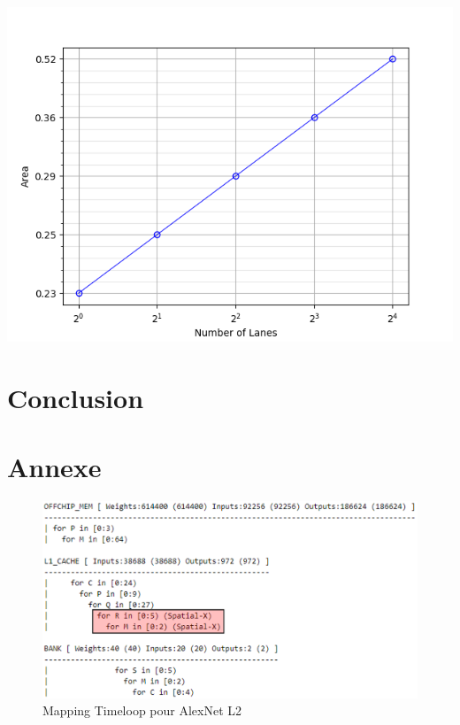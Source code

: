 \documentclass[10pt,letterpaper]{article}
\begin{document}
\begin{multicols}{2}
    {\centering
    \includegraphics[width=\linewidth]{area.png}
    \captionsetup{hypcap=false}
    \label{fig:area}}
    \bigskip

    \end{multicols}

\section{Conclusion}
    \begin{multicols}{2}
    
    \end{multicols}

{}
    

\pagebreak
\section*{Annexe}

    \begin{figure}[H]
        \centering
        \includegraphics[width=0.9\linewidth]{map_timeloop_alex_L2.png}
        \caption{Mapping Timeloop pour AlexNet L2}
        \label{fig:map_timeloop_alex_L2}
    \end{figure}
\end{document}
